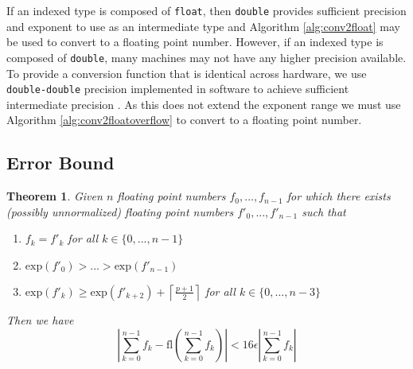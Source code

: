\documentclass[12pt]{article}
\providecommand{\ceil}[1]{\left \lceil #1 \right \rceil }
\providecommand{\exp}{\ensuremath{\text{exp}}}
\providecommand{\fl}{\ensuremath{\text{fl}}}
\theoremstyle{plain}
\newtheorem{thm}{Theorem}[section]
\numberwithin{equation}{section}
\begin{document}
    If an indexed type is composed of \verb|float|, then \verb|double| provides sufficient precision and exponent to use as an intermediate type and Algorithm \ref{alg:conv2float} may be used to convert to a floating point number.
    However, if an indexed type is composed of \verb|double|, many machines may not have any higher precision available. To provide a conversion function that is identical across hardware, we use \verb|double-double| precision implemented in software to achieve sufficient intermediate precision \cite{doubledouble}. As this does not extend the exponent range we must use Algorithm \ref{alg:conv2floatoverflow} to convert to a floating point number.

  \subsection{Error Bound}
    \begin{thm}
      Given $n$ floating point numbers $f_0, ..., f_{n - 1}$ for which there exists (possibly unnormalized) floating point numbers $f'_0, ..., f'_{n - 1}$ such that
      \begin{enumerate}
        \item $f_k = f'_k$ for all $k \in \{0, ..., n - 1\}$
        \item $\exp(f'_0) > ... > \exp(f'_{n - 1})$
        \item $\exp(f'_k) \geq \exp(f'_{k + 2}) + \ceil{\frac{p + 1}{2}}$ for all $k \in \{0, ..., n - 3\}$
      \end{enumerate}
      \label{thm:mysortsum}
      Then we have
      \begin{equation*}
        |\sum \limits_{k = 0}^{n - 1} f_k - \fl(\sum \limits_{k = 0}^{n - 1} f_k)| < 16\epsilon|\sum\limits_{k = 0}^{n - 1}f_k|
      \end{equation*}
    \end{thm}
\end{document}
